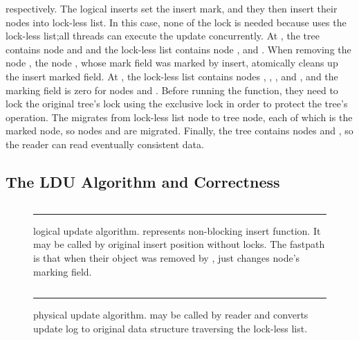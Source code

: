  respectively.
The logical inserts set the insert mark, and they then insert their
nodes into lock-less list.
In this case, none of the lock is needed because  uses the lock-less
list;all threads can execute the update concurrently.
At , the tree contains node 
and  and 
the lock-less list contains node ,  and .
When removing the node , the node , whose mark field was marked
by insert, atomically cleans up the insert marked field.
At , the lock-less list contains nodes
, , , and , and the marking field is zero for 
nodes  and .
Before running the  function, they need to lock the original
 tree's lock using the exclusive lock in order to protect the tree's
 operation.
The  migrates from lock-less list node to tree node, each of 
which is the marked node, so nodes  and  are migrated.
Finally, the tree contains nodes  and , so the reader can read
 eventually consistent data.
\fi

\subsection{The LDU Algorithm and Correctness}

\begin{figure}[tb]
\begin{center}
\inputminted[linenos,fontsize=\footnotesize, tabsize=2]{c}{src/ldu_logical.c}
\end{center}
\rule{\columnwidth}{0.5pt}
\vspace{-\baselineskip}
\caption{ logical update algorithm.  represents
 non-blocking insert function.
It may be called by original insert position without locks. The fastpath is
 that when their object was removed by ,
  just changes node's marking field.}
\label{fig:gldulogicalupdate}
\end{figure}

\begin{figure}[tb]
\begin{center}
\inputminted[linenos,fontsize=\footnotesize, tabsize=2]{c}{src/ldu_physical.c}
\end{center}
\rule{\columnwidth}{0.5pt}
\vspace{-\baselineskip}
\caption{ physical update algorithm.  may be
 called by reader and converts update log to original data structure
 traversing the lock-less list.}
\label{fig:glduphysicalupdate}
\end{figure}

